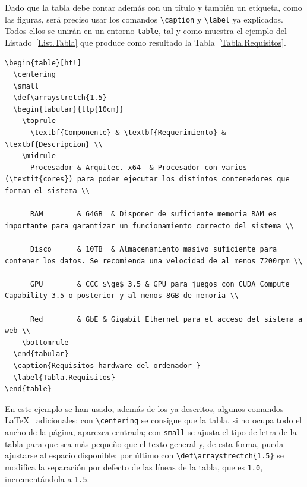 Dado que la tabla debe contar además con un título y también un etiqueta, como las figuras, será preciso usar los comandos \verb|\caption| y \verb|\label| ya explicados. Todos ellos se unirán en un entorno \verb|table|, tal y como muestra el ejemplo del Listado~\ref{List.Tabla} que produce como resultado la Tabla~\ref{Tabla.Requisitos}.

\begin{lstlisting}[language={[LaTeX]TeX},caption={Creación de una tabla},label={List.Tabla}]
\begin{table}[ht!]
  \centering
  \small
  \def\arraystretch{1.5}
  \begin{tabular}{llp{10cm}}
    \toprule
      \textbf{Componente} & \textbf{Requerimiento} & \textbf{Descripcion} \\
    \midrule
      Procesador & Arquitec. x64  & Procesador con varios (\textit{cores}) para poder ejecutar los distintos contenedores que forman el sistema \\
      
      RAM        & 64GB  & Disponer de suficiente memoria RAM es importante para garantizar un funcionamiento correcto del sistema \\
      
      Disco      & 10TB  & Almacenamiento masivo suficiente para contener los datos. Se recomienda una velocidad de al menos 7200rpm \\
      
      GPU        & CCC $\ge$ 3.5 & GPU para juegos con CUDA Compute Capability 3.5 o posterior y al menos 8GB de memoria \\
      
      Red        & GbE & Gigabit Ethernet para el acceso del sistema a web \\
    \bottomrule
  \end{tabular}
  \caption{Requisitos hardware del ordenador }
  \label{Tabla.Requisitos}
\end{table}
\end{lstlisting}

En este ejemplo se han usado, además de los ya descritos, algunos comandos \LaTeX~ adicionales: con \verb|\centering| se consigue que la tabla, si no ocupa todo el ancho de la página, aparezca centrada; con \verb|small| se ajusta el tipo de letra de la tabla para que sea más pequeño que el texto general y, de esta forma, pueda ajustarse al espacio disponible; por último con \verb|\def\arraystrectch{1.5}| se modifica la separación por defecto de las líneas de la tabla, que es \texttt{1.0}, incrementándola a \texttt{1.5}.

